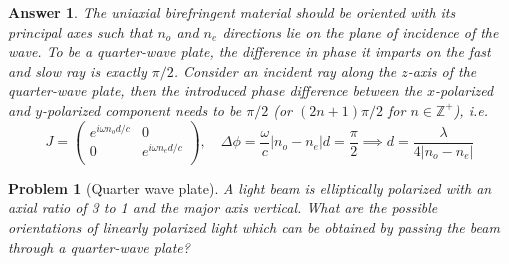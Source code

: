\documentclass[a4paper]{article}
\newtheorem{ans}{Answer}
\theoremstyle{new}
\newtheorem{qns}{Problem}
\begin{document}
\begin{ans}
The uniaxial birefringent material should be oriented with its principal axes such that $n_o$ and $n_e$ directions lie on the plane of incidence of the wave. To be a quarter-wave plate, the difference in phase it imparts on the fast and slow ray is exactly $\pi/2$. Consider an incident ray along the $z$-axis of the quarter-wave plate, then the introduced phase difference between the $x$-polarized and $y$-polarized component needs to be $\pi/2$ (or $(2n+1)\pi/2$ for $n\in\mathbb{Z}^+$), i.e.
$$J=\begin{pmatrix}e^{i\omega n_od/c}&0\\0&e^{i\omega n_ed/c}\\\end{pmatrix},\quad\Delta\phi=\frac{\omega}{c}|n_o-n_e|d=\frac{\pi}{2}\implies d=\frac{\lambda}{4|n_o-n_e|}$$
\end{ans}
\begin{qns}[Quarter wave plate]
A light beam is elliptically polarized with an axial ratio of 3 to 1 and the major axis vertical. What are the possible orientations of linearly polarized light which can be obtained by passing the beam through a quarter-wave plate?
\end{qns}
\end{document}
